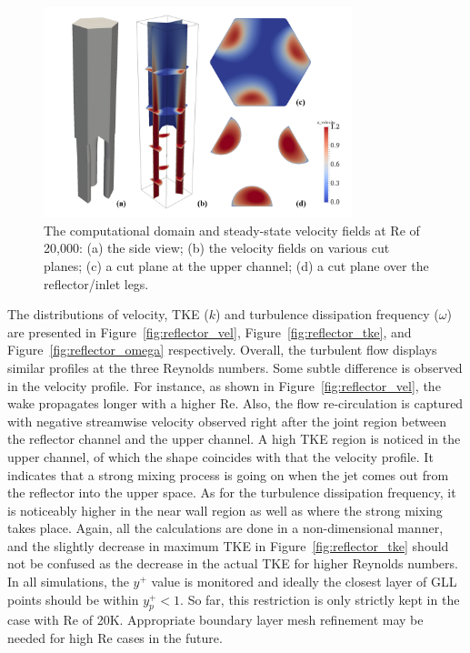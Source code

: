 \begin{figure}[!ht]
\centering
\includegraphics[width=0.8\textwidth]{./figures/reflector_domain.png}
\caption{The computational domain and steady-state velocity fields at Re of 20,000: (a) the side view; (b) the velocity fields on various cut planes; (c) a cut plane at the upper channel; (d) a cut plane over the reflector/inlet legs. }
\label{fig:reflector}
\end{figure}


The distributions of velocity, TKE ($k$) and turbulence dissipation frequency ($\omega$) are presented in Figure~\ref{fig:reflector_vel}, Figure~\ref{fig:reflector_tke}, and Figure~\ref{fig:reflector_omega} respectively.
Overall, the turbulent flow displays similar profiles at the three Reynolds numbers.
Some subtle difference is observed in the velocity profile.
For instance, as shown in Figure~\ref{fig:reflector_vel}, the wake propagates longer with a higher Re.
Also, the flow re-circulation is captured with negative streamwise velocity observed right after the joint region between the reflector channel and the upper channel.
A high TKE region is noticed in the upper channel, of which the shape coincides with that the velocity profile.
It indicates that a strong mixing process is going on when the jet comes out from the reflector into the upper space.
As for the turbulence dissipation frequency, it is noticeably higher in the near wall region as well as where the strong mixing takes place.
Again, all the calculations are done in a non-dimensional manner, and the slightly decrease in maximum TKE in Figure~\ref{fig:reflector_tke} should not be confused as the decrease in the actual TKE for higher Reynolds numbers.
In all simulations, the $y^+$ value is monitored and ideally the closest layer of GLL points should be within $y_p^+ < 1$.
So far, this restriction is only strictly kept in the case with Re of 20K.
Appropriate boundary layer mesh refinement may be needed for high Re cases in the future.

